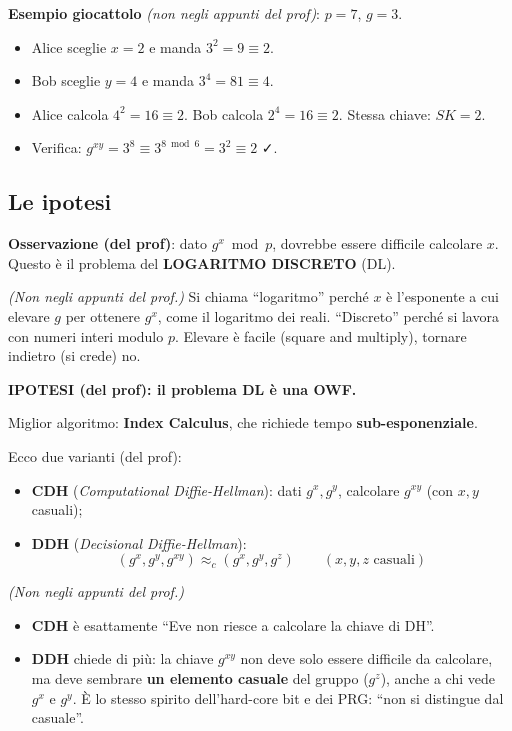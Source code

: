 \begin{esempio}
\textbf{Esempio giocattolo} \emph{(non negli appunti del prof)}: \(p = 7\), \(g = 3\).
\begin{itemize}
  \item Alice sceglie \(x = 2\) e manda \(3^2 = 9 \equiv 2\).
  \item Bob sceglie \(y = 4\) e manda \(3^4 = 81 \equiv 4\).
  \item Alice calcola \(4^2 = 16 \equiv 2\). Bob calcola \(2^4 = 16 \equiv 2\). Stessa chiave: \(SK = 2\).
  \item Verifica: \(g^{xy} = 3^8 \equiv 3^{8 \bmod 6} = 3^2 \equiv 2\) ✓.
\end{itemize}
\end{esempio}

\subsection{Le ipotesi}

\textbf{Osservazione (del prof)}: dato \(g^x \bmod p\), dovrebbe essere difficile calcolare \(x\). Questo è il problema del \textbf{LOGARITMO DISCRETO} (DL).

\emph{(Non negli appunti del prof.)} Si chiama ``logaritmo'' perché \(x\) è l'esponente a cui elevare \(g\) per ottenere \(g^x\), come il logaritmo dei reali. ``Discreto'' perché si lavora con numeri interi modulo \(p\). Elevare è facile (square and multiply), tornare indietro (si crede) no.

\textbf{IPOTESI (del prof): il problema DL è una OWF.}

Miglior algoritmo: \textbf{Index Calculus}, che richiede tempo \textbf{sub-esponenziale}.

Ecco due varianti (del prof):
\begin{itemize}
  \item \textbf{CDH} (\emph{Computational Diffie-Hellman}): dati \(g^x, g^y\), calcolare \(g^{xy}\) (con \(x, y\) casuali);
  \item \textbf{DDH} (\emph{Decisional Diffie-Hellman}):
  \[
  (g^x, g^y, g^{xy}) \approx_c (g^x, g^y, g^z) \qquad (x, y, z \text{ casuali})
  \]
\end{itemize}

\begin{nota}
\emph{(Non negli appunti del prof.)}
\begin{itemize}
  \item \textbf{CDH} è esattamente ``Eve non riesce a calcolare la chiave di DH''.
  \item \textbf{DDH} chiede di più: la chiave \(g^{xy}\) non deve solo essere difficile da calcolare, ma deve sembrare \textbf{un elemento casuale} del gruppo (\(g^z\)), anche a chi vede \(g^x\) e \(g^y\). È lo stesso spirito dell'hard-core bit e dei PRG: ``non si distingue dal casuale''.
\end{itemize}
\end{nota}

